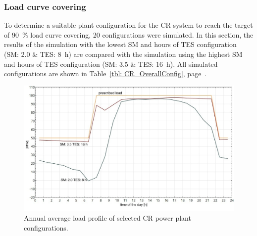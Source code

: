 \subsubsection{Load curve covering}

To determine a suitable plant configuration for the CR system to reach the target of \SI{90}{\percent} load curve covering, 20 configurations were simulated. In this section, the results of the simulation with the lowest SM and hours of TES configuration (SM: 2.0 \& TES: \SI{8}{h}) are compared with the simulation using the highest SM and hours of TES configuration (SM: 3.5 \& TES: \SI{16}{h}). All simulated configurations are shown in Table~\ref{tbl: CR_OverallConfig}, page~\pageref{tbl: CR_OverallConfig}.

\begin{figure}[htbp]  
\centering
\includegraphics[width=0.8\linewidth]{FIG/CR_annual_profil}
\caption[Annual average load profile of selected CR power plant configurations.]{Annual average load profile of selected CR power plant configurations.}\label{CR_annual_profil}
\end{figure}


